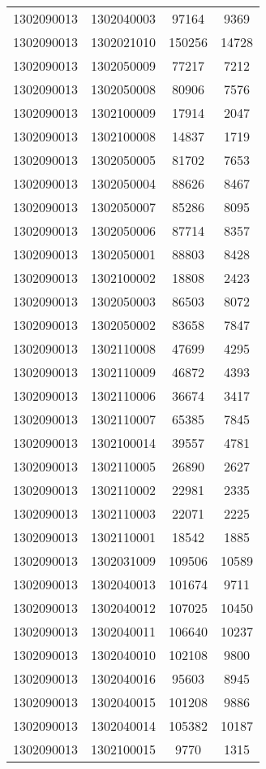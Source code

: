 \begin{longtable}{llcc}
1302090013 & 1302040003 & 97164 & 9369\\
1302090013 & 1302021010 & 150256 & 14728\\
1302090013 & 1302050009 & 77217 & 7212\\
1302090013 & 1302050008 & 80906 & 7576\\
1302090013 & 1302100009 & 17914 & 2047\\
1302090013 & 1302100008 & 14837 & 1719\\
1302090013 & 1302050005 & 81702 & 7653\\
1302090013 & 1302050004 & 88626 & 8467\\
1302090013 & 1302050007 & 85286 & 8095\\
1302090013 & 1302050006 & 87714 & 8357\\
1302090013 & 1302050001 & 88803 & 8428\\
1302090013 & 1302100002 & 18808 & 2423\\
1302090013 & 1302050003 & 86503 & 8072\\
1302090013 & 1302050002 & 83658 & 7847\\
1302090013 & 1302110008 & 47699 & 4295\\
1302090013 & 1302110009 & 46872 & 4393\\
1302090013 & 1302110006 & 36674 & 3417\\
1302090013 & 1302110007 & 65385 & 7845\\
1302090013 & 1302100014 & 39557 & 4781\\
1302090013 & 1302110005 & 26890 & 2627\\
1302090013 & 1302110002 & 22981 & 2335\\
1302090013 & 1302110003 & 22071 & 2225\\
1302090013 & 1302110001 & 18542 & 1885\\
1302090013 & 1302031009 & 109506 & 10589\\
1302090013 & 1302040013 & 101674 & 9711\\
1302090013 & 1302040012 & 107025 & 10450\\
1302090013 & 1302040011 & 106640 & 10237\\
1302090013 & 1302040010 & 102108 & 9800\\
1302090013 & 1302040016 & 95603 & 8945\\
1302090013 & 1302040015 & 101208 & 9886\\
1302090013 & 1302040014 & 105382 & 10187\\
1302090013 & 1302100015 & 9770 & 1315\\

\end{longtable}
